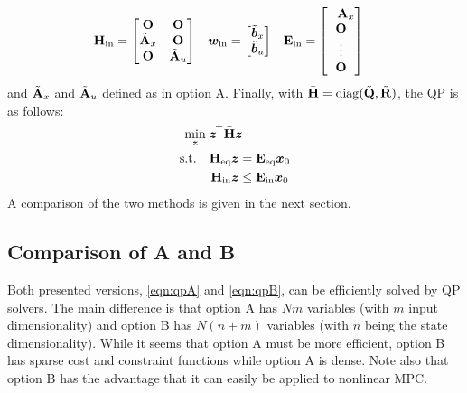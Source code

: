 			\begin{align}
				\bm{\mathrm{H}}_\mathrm{in}                                       & =
				\begin{bmatrix}
					\bm{\mathrm{O}}           & \bm{\mathrm{O}}           \\
					\tilde{\bm{\mathrm{A}}}_x & \bm{\mathrm{O}}           \\
					\bm{\mathrm{O}}           & \tilde{\bm{\mathrm{A}}}_u
				\end{bmatrix} &
				\bm{w}_\mathrm{in}                                       & =
				\begin{bmatrix}
					\tilde{\bm{b}}_x \\
					\tilde{\bm{b}}_u
				\end{bmatrix}                     &
				\bm{\mathrm{E}}_\mathrm{in}                                       & =
				\begin{bmatrix}
					-\bm{\mathrm{A}}_x \\
					\bm{\mathrm{O}}    \\
					\vdots     \\
					\bm{\mathrm{O}}
				\end{bmatrix}
			\end{align}
			and \(\tilde{\bm{\mathrm{A}}}_x\) and \(\tilde{\bm{\mathrm{A}}}_u\) defined as in option A. Finally, with \( \bar{\bm{\mathrm{H}}} = \operatorname{diag}(\tilde{\bm{\mathrm{Q}}}, \tilde{\bm{\mathrm{R}}}) \), the QP is as follows:
			\begin{equation}
				\begin{aligned}
					\min_{\bm{z}}\; & \bm{z}^{\!\top} \bar{\bm{\mathrm{H}}} \bm{z} \\
					\text{s.t.}\quad &
					\begin{aligned}[t]
						\bm{\mathrm{H}}_\mathrm{eq} \bm{z} & = \bm{\mathrm{E}}_\mathrm{eq} \bm{x}_0    \\
						\bm{\mathrm{H}}_\mathrm{in} \bm{z} & \leq \bm{\mathrm{E}}_\mathrm{in} \bm{x}_0
					\end{aligned}
				\end{aligned}
				\label{eqn:qpB}
			\end{equation}
			A comparison of the two methods is given in the next section.

		\subsection{Comparison of A and B}
			Both presented versions, \eqref{eqn:qpA} and \eqref{eqn:qpB}, can be efficiently solved by QP solvers. The main difference is that option A has \(Nm\) variables (with \(m\) input dimensionality) and option B has \(N (n + m)\) variables (with \(n\) being the state dimensionality). While it seems that option A must be more efficient, option B has sparse cost and constraint functions while option A is dense. Note also that option B has the advantage that it can easily be applied to nonlinear MPC.

